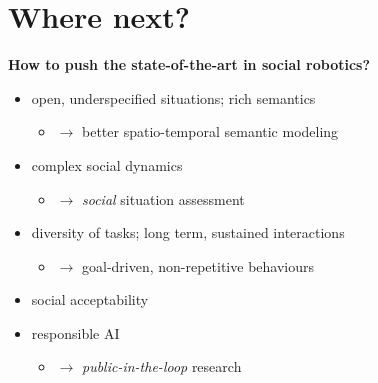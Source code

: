 \documentclass[xcolor=table]{beamer}
\begin{document}
\section{Where next?}


\begin{frame}{}

    \begin{center}

    \Large
    \bf How to push the state-of-the-art in social robotics?

    \end{center}

    \begin{itemize}
        \item open, underspecified situations; rich semantics
            \begin{itemize}
                \item<2-> $\rightarrow$ better spatio-temporal semantic modeling
            \end{itemize}
        \item complex social dynamics
            \begin{itemize}
                \item<3-> $\rightarrow$ \emph{social} situation assessment 
            \end{itemize}
        \item diversity of tasks; long term, sustained interactions
            \begin{itemize}
                \item<4-> $\rightarrow$ goal-driven, non-repetitive behaviours
            \end{itemize}
    \end{itemize}


    \begin{itemize}
        \item<5-> social acceptability
        \item<5-> responsible AI
            \begin{itemize}
                \item<6-> $\rightarrow$ \emph{public-in-the-loop} research
                    
            \end{itemize}
    \end{itemize}



\end{frame}
\end{document}
